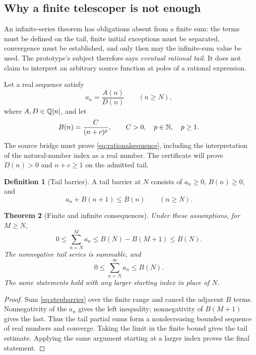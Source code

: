 \documentclass[11pt,a4paper]{article}
\newtheorem{theorem}{Theorem}[section]
\theoremstyle{definition}\newtheorem{definition}[theorem]{Definition}
\begin{document}
\subsection{Why a finite telescoper is not enough}

An infinite-series theorem has obligations absent from a finite sum: the terms
must be defined on the tail, finite initial exceptions must be separated,
convergence must be established, and only then may the infinite-sum value be
used. The prototype's subject therefore says \emph{eventual rational tail}.
It does not claim to interpret an arbitrary source function at poles of a
rational expression.

Let a real sequence satisfy
\begin{equation}\label{eq:rationalsequence}
 a_n=\frac{A(n)}{D(n)}\qquad(n\ge N),
\end{equation}
where $A,D\in\mathbb Q[n]$, and let
\begin{equation}\label{eq:barrier}
 B(n)=\frac{C}{(n+c)^p},\qquad C>0,\quad p\in\mathbb N,\quad p\ge1.
\end{equation}
The source bridge must prove \eqref{eq:rationalsequence}, including the
interpretation of the natural-number index as a real number. The certificate
will prove $D(n)>0$ and $n+c\ge1$ on the admitted tail.

\begin{definition}[Tail barrier]
A tail barrier at $N$ consists of $a_n\ge0$, $B(n)\ge0$, and
\begin{equation}\label{eq:stepbarrier}
 a_n+B(n+1)\le B(n)\qquad(n\ge N).
\end{equation}
\end{definition}

\begin{theorem}[Finite and infinite consequences]\label{thm:tailsound}
Under these assumptions, for $M\ge N$,
\begin{equation}\label{eq:finitetail}
 0\le\sum_{n=N}^{M}a_n\le B(N)-B(M+1)\le B(N).
\end{equation}
The nonnegative tail series is summable, and
\[
 0\le\sum_{n=N}^{\infty}a_n\le B(N).
\]
The same statements hold with any larger starting index in place of $N$.
\end{theorem}
\begin{proof}
Sum \eqref{eq:stepbarrier} over the finite range and cancel the adjacent
$B$ terms. Nonnegativity of the $a_n$ gives the left inequality; nonnegativity
of $B(M+1)$ gives the last. Thus the tail partial sums form a nondecreasing
bounded sequence of real numbers and converge. Taking the limit in the finite
bound gives the tail estimate. Applying the same argument starting at a larger
index proves the final statement.
\end{proof}
\end{document}
